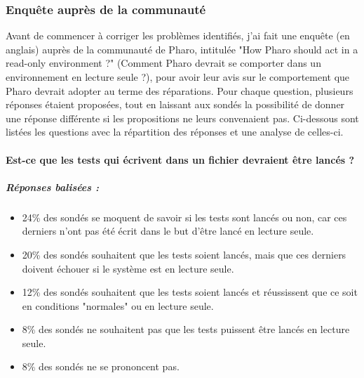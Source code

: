 \subsubsection{Enquête auprès de la communauté}
Avant de commencer à corriger les problèmes identifiés, j'ai fait une enquête (en anglais) auprès de la communauté de Pharo, intitulée "How Pharo should act in a read-only environment ?" (Comment Pharo devrait se comporter dans un environnement en lecture seule ?), pour avoir leur avis sur le comportement que Pharo devrait adopter au terme des réparations. Pour chaque question, plusieurs réponses étaient proposées, tout en laissant aux sondés la possibilité de donner une réponse différente si les propositions ne leurs convenaient pas. Ci-dessous sont listées les questions avec la répartition des réponses et une analyse de celles-ci.

\paragraph{Est-ce que les tests qui écrivent dans un fichier devraient être lancés ?}
\subparagraph{Réponses balisées :}
\begin{itemize}
	\item 24\% des sondés se moquent de savoir si les tests sont lancés ou non, car ces derniers n'ont pas été écrit dans le but d'être lancé en lecture seule.
	\item 20\% des sondés souhaitent que les tests soient lancés, mais que ces derniers doivent échouer si le système est en lecture seule.
	\item 12\% des sondés souhaitent que les tests soient lancés et réussissent que ce soit en conditions "normales" ou en lecture seule.
	\item 8\% des sondés ne souhaitent pas que les tests puissent être lancés en lecture seule.
	\item 8\% des sondés ne se prononcent pas.
\end{itemize}

